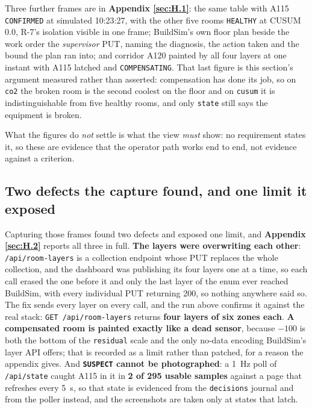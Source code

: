 Three further frames are in \textbf{Appendix \ref{sec:H.1}}: the same table with A115 \texttt{CONFIRMED} at
simulated 10:23:27, with the other five rooms \texttt{HEALTHY} at CUSUM 0.0, R-7's isolation
visible in one frame; BuildSim's own floor plan
beside the work order the \emph{supervisor} PUT, naming the diagnosis, the action taken and the bound
the plan ran into; and corridor A120 painted by all four layers at one instant with A115 latched and
\texttt{COMPENSATING}. That last figure is this section's argument measured rather than asserted:
compensation has done its job, so on \texttt{co2} the broken room is the second coolest on the floor
and on \texttt{cusum} it is indistinguishable from five healthy rooms, and only \texttt{state} still
says the equipment is broken.

What the figures do \emph{not} settle is what the view \emph{must} show: no requirement states it,
so these are evidence that the operator path works end to end, not evidence against a criterion.

\subsection{Two defects the capture found, and one limit it exposed}\label{sec:12.1}

Capturing those frames found two defects and exposed one limit, and \textbf{Appendix \ref{sec:H.2}} reports all
three in full. \textbf{The layers were overwriting each other}: \texttt{/api/room-layers} is a
collection endpoint whose PUT replaces the whole collection, and the dashboard was publishing its
four layers one at a time, so each call erased the one before it and only the last layer of the enum
ever reached BuildSim, with every individual PUT returning 200, so nothing anywhere said so. The
fix sends every layer on every call, and the run above confirms it against the real stack:
\texttt{GET /api/room-layers} returns \textbf{four layers of six zones each}. \textbf{A compensated
room is painted exactly like a dead sensor}, because $-100$ is both the bottom of the
\texttt{residual} scale and the only no-data encoding BuildSim's layer API offers; that is recorded
as a limit rather than patched, for a reason the appendix gives. And \textbf{\texttt{SUSPECT} cannot
be photographed}: a 1~Hz poll of \texttt{/api/state} caught A115 in it in \textbf{2 of 295 usable
samples} against a page that refreshes every 5~s, so that state is evidenced from the
\texttt{decisions} journal and from the poller instead, and the screenshots are taken only at states
that latch.
